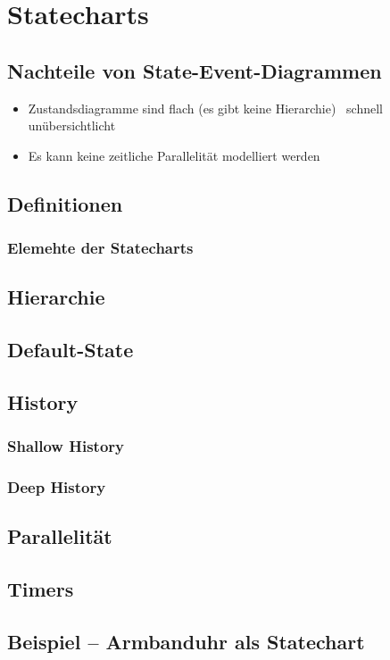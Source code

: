 \section{Statecharts}

\subsection{Nachteile von State-Event-Diagrammen}

\begin{itemize}
    \item Zustandsdiagramme sind flach (es gibt keine Hierarchie) \textrightarrow\ schnell unübersichtlicht
    \item Es kann keine zeitliche Parallelität modelliert werden
\end{itemize}


\subsection{Definitionen}


\subsubsection{Elemehte der Statecharts}



\subsection{Hierarchie}


\subsection{Default-State}


\subsection{History}

\subsubsection{Shallow History}


\subsubsection{Deep History}



\subsection{Parallelität}


\subsection{Timers}



\subsection{Beispiel -- Armbanduhr als Statechart}  %

